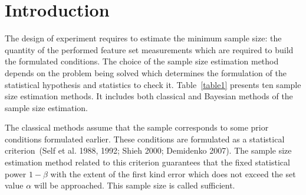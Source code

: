 \documentclass[
11pt,%
tightenlines,%
twoside,%
onecolumn,%
nofloats,%
nobibnotes,%
nofootinbib,%
superscriptaddress,%
noshowpacs,%
centertags]%
{revtex4}
\begin{document}
\section{Introduction}
The design of experiment requires to estimate the minimum sample size: the quantity of the performed feature set measurements which are required to build the formulated conditions. The choice of the sample size estimation method depends on the problem being solved which determines the formulation of the statistical hypothesis and statistics to check it. Table~\ref{table1} presents ten sample size estimation methods. It includes both classical and Bayesian methods of the sample size estimation.

The classical methods assume that the sample corresponds to some prior conditions formulated earlier. These conditions are formulated as a statistical criterion~(Self et al. 1988, 1992; Shieh 2000; Demidenko 2007). The sample size estimation method related to this criterion guarantees that the fixed statistical power $1-\beta$ with the extent of the first kind error which does not exceed the set value $\alpha$ will be approached. This sample size is called sufficient.
\end{document}
